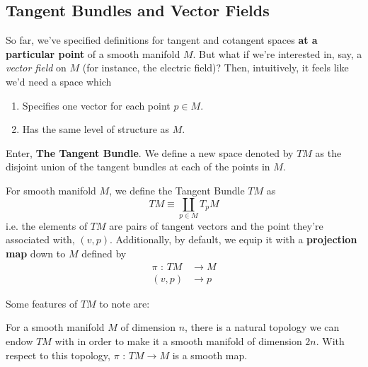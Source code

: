 \documentclass[11pt]{article}
\begin{document}
\subsection{Tangent Bundles and Vector Fields}
So far, we've specified definitions for tangent and cotangent spaces \textbf{at a particular point} of a smooth manifold $M$. But what if we're interested in, say, a \textit{vector field} on $M$ (for instance, the electric field)? Then, intuitively, it feels like we'd need a space which
\begin{enumerate}
  \item Specifies one vector for each point $p \in M$.
  \item Has the same level of structure as $M$.
\end{enumerate}
Enter, \textbf{The Tangent Bundle}. We define a new space denoted by $TM$ as the disjoint union of the tangent bundles at each of the points in $M$.
\begin{redbox}
  For smooth manifold $M$, we define the Tangent Bundle $TM$ as 
  \[ TM \equiv \coprod_{p \in M} T_p M \]
  i.e. the elements of $TM$ are pairs of tangent vectors and the point they're associated with, $(v, p)$. Additionally, by default, we equip it with a \textbf{projection map} down to $M$ defined by
  \begin{align*}
    \pi \text{ : } TM &\rightarrow M \\
          (v, p) &\rightarrow p
  \end{align*}
\end{redbox}
\vskip 0.5cm
Some features of $TM$ to note are:
\begin{bluebox}
  \begin{theorem}
  For a smooth manifold $M$ of dimension $n$, there is a natural topology we can endow $TM$ with in order to make it a smooth manifold of dimension $2n$. With respect to this topology, $\pi \text{ : } TM \rightarrow M$ is a smooth map.
  \end{theorem}
\end{bluebox}
\end{document}
